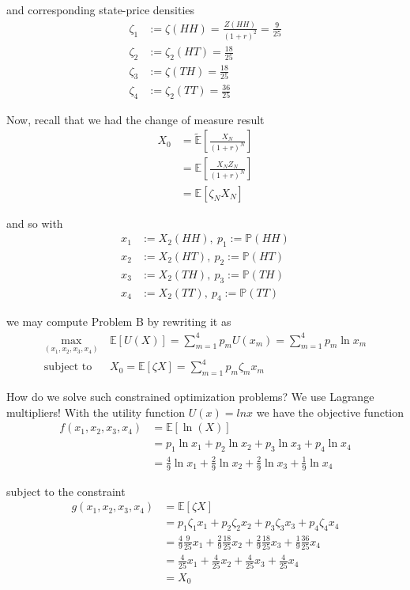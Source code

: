 \documentclass[12pt]{article}
\newlength\tindent
\renewcommand{\indent}{\hspace*{\tindent}}
\renewcommand{\P}{\mathbb P}
\newcommand{\E}{\mathbb E}
\begin{document}
and corresponding state-price densities
\begin{align*}
	\zeta_1 &:= \zeta(HH) = \frac{Z(HH)}{(1 + r)^2} = \frac{9}{25} \\
	\zeta_2 &:= \zeta_2(HT) = \frac{18}{25} \\
	\zeta_3 &:= \zeta(TH) = \frac{18}{25} \\
	\zeta_4 &:= \zeta_2(TT) = \frac{36}{25}
\end{align*}

Now, recall that we had the change of measure result
\begin{align*}
	X_0 &= \tilde{\E} \left[ \frac{X_N}{(1 + r)^N} \right] \\
	&= \E \left[ \frac{X_NZ_N}{(1 + r)^N} \right] \\
	&= \E \left[ \zeta_N X_N \right]
\end{align*}

and so with
\begin{align*}
	x_1 &:= X_2(HH),~p_1 := \P(HH) \\
	x_2 &:= X_2(HT),~p_2 := \P(HT) \\
	x_3 &:= X_2(TH),~p_3 := \P(TH) \\
	x_4 &:= X_2(TT),~p_4 := \P(TT)
\end{align*}

we may compute Problem B by rewriting it as
\begin{align*}
	\max_{(x_1,x_2,x_3,x_4)}~&\E[U(X)] = \sum^4_{m = 1} p_mU(x_m) = \sum^4_{m = 1} p_m \ln x_m \\
	\text{subject to }~&X_0 = \E[\zeta X] = \sum^4_{m = 1} p_m\zeta_mx_m
\end{align*}

\indent How do we solve such constrained optimization problems? We use Lagrange multipliers! With the utility function $U(x) = ln x$ we have the objective function
\begin{align*}
	f(x_1,x_2,x_3,x_4) &= \E[\ln(X)] \\
	&= p_1 \ln x_1 + p_2 \ln x_2 + p_3 \ln x_3 + p_4 \ln x_4 \\
	&= \frac{4}{9} \ln x_1 + \frac{2}{9} \ln x_2 + \frac{2}{9} \ln x_3 + \frac{1}{9} \ln x_4
\end{align*}

subject to the constraint
\begin{align*}
	g(x_1, x_2, x_3, x_4) &= \E[\zeta X] \\
	&= p_1 \zeta_1x_1 + p_2\zeta_2x_2 + p_3\zeta_3x_3 + p_4\zeta_4x_4 \\
	&= \frac{4}{9}\frac{9}{25}x_1 + \frac{2}{9}\frac{18}{25}x_2 + \frac{2}{9}\frac{18}{25}x_3 + \frac{1}{9}\frac{36}{25}x_4 \\
	&= \frac{4}{25}x_1 + \frac{4}{25}x_2 + \frac{4}{25}x_3 + \frac{4}{25}x_4 \\
	&= X_0 
\end{align*}
\end{document}

